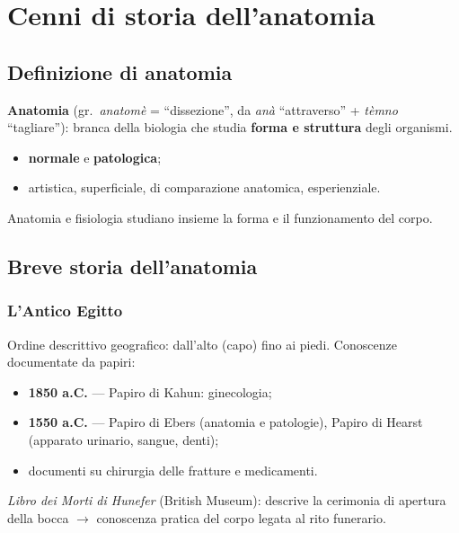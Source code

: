 \chapter{Cenni di storia dell'anatomia}

\section{Definizione di anatomia}

\textbf{Anatomia} (gr.\ \textit{anatomè} = ``dissezione'', da \textit{anà} ``attraverso'' +
\textit{tèmno} ``tagliare''): branca della biologia che studia \textbf{forma e struttura} degli
organismi.

\begin{itemize}
  \item \textbf{normale} e \textbf{patologica};
  \item artistica, superficiale, di comparazione anatomica, esperienziale.
\end{itemize}
Anatomia e fisiologia studiano insieme la forma e il funzionamento del corpo.

\section{Breve storia dell'anatomia}

\subsection{L'Antico Egitto}
Ordine descrittivo geografico: dall'alto (capo) fino ai piedi. Conoscenze documentate da papiri:
\begin{itemize}
  \item \textbf{1850 a.C.} --- Papiro di Kahun: ginecologia;
  \item \textbf{1550 a.C.} --- Papiro di Ebers (anatomia e patologie), Papiro di Hearst (apparato
    urinario, sangue, denti);
  \item documenti su chirurgia delle fratture e medicamenti.
\end{itemize}
\textit{Libro dei Morti di Hunefer} (British Museum): descrive la cerimonia di apertura della
bocca $\rightarrow$ conoscenza pratica del corpo legata al rito funerario.

